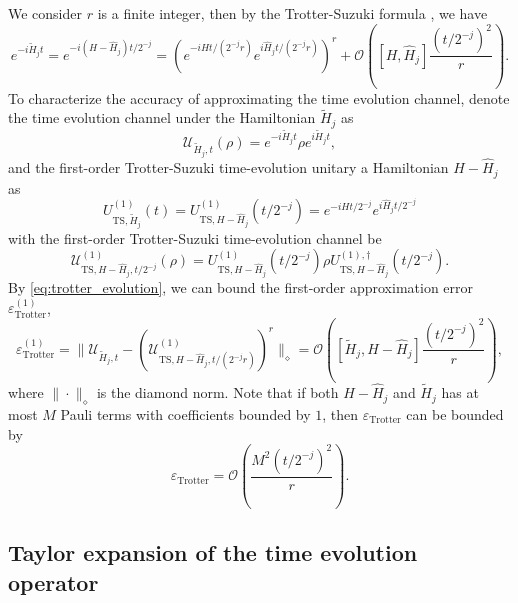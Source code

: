 \documentclass[twocolumn,superscriptaddress,aps,showpacs,amsmath,amstex,amssymb,citeautoscript,floatfix,pra,preprintnumbers]{revtex4-2}
\theoremstyle{plain}
\theoremstyle{plain}
\theoremstyle{plain}
\theoremstyle{plain}
\theoremstyle{plain}
\theoremstyle{plain}
\begin{document}
\begin{appendix}
We consider $r$ is a finite integer, then by the Trotter-Suzuki formula \cite{Suzuki1, SuzukiConvergence, PRXQuantum.5.020330, PhysRevX.11.011020}, we have
\begin{equation}
\label{eq:trotter_evolution}
    e^{-i\tilde{H}_jt} = e^{-i(H-\hat{H}_j)t/2^{-j}} =  \left(e^{-iHt/(2^{-j}r)}e^{i\hat{H}_jt/(2^{-j}r)}\right)^r + \mathcal{O}\left([H, \hat{H}_j]\frac{(t/2^{-j})^2}{r}\right).
\end{equation}
To characterize the accuracy of approximating the time evolution channel, denote the time evolution channel under the Hamiltonian $\tilde{H}_j$ as
\begin{equation}
    \mathcal{U}_{\tilde{H}_j,t}(\rho) = e^{-i\tilde{H}_jt}\rho e^{i\tilde{H}_jt},
\end{equation}
and the first-order Trotter-Suzuki time-evolution unitary a Hamiltonian $H - \hat{H}_j$ as
\begin{equation}
    U^{(1)}_{\text{TS},\tilde{H}_j}(t) = U^{(1)}_{\text{TS},H - \hat{H}_j}(t/2^{-j}) = e^{-iHt/2^{-j}}e^{i\hat{H}_jt/2^{-j}}
\end{equation}
with the first-order Trotter-Suzuki time-evolution channel be
\begin{equation}
    \mathcal{U}^{(1)}_{\text{TS},H - \hat{H}_j,t/2^{-j}}(\rho) = U^{(1)}_{\text{TS},H - \hat{H}_j}(t/2^{-j})\rho U^{(1),\dagger}_{\text{TS},H - \hat{H}_j}(t/2^{-j}).
\end{equation}
By \eqref{eq:trotter_evolution}, we can bound the first-order approximation error $\varepsilon^{(1)}_{\text{Trotter}}$,
\begin{equation}
    \varepsilon^{(1)}_{\text{Trotter}} = \|\mathcal{U}_{\tilde{H}_j,t}-(\mathcal{U}^{(1)}_{\text{TS},H - \hat{H}_j,t/(2^{-j}r)})^r\|_{\diamond} = \mathcal{O}\left([\tilde{H}_j, H - \hat{H}_j]\frac{(t/2^{-j})^2}{r}\right),
\end{equation}
where $\|\cdot\|_{\diamond}$ is the diamond norm. Note that if both $H - \hat{H}_j$ and $\tilde{H}_j$ has at most $M$ Pauli terms with coefficients bounded by $1$, then $\varepsilon_{\text{Trotter}}$ can be bounded by
\begin{equation}
\label{eq:eps_trotter}
    \varepsilon_{\text{Trotter}} = \mathcal{O}\left(\frac{M^2(t/2^{-j})^2}{r}\right).
\end{equation}


\subsection{Taylor expansion of the time evolution operator\label{app:Taylor}}


\end{appendix}
\end{document}
